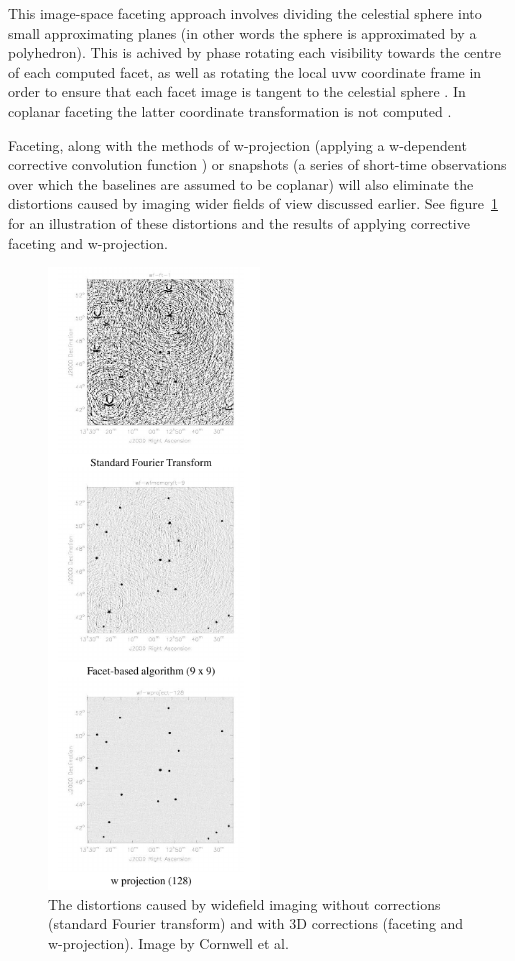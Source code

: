 \documentclass[a4paper, two column]{article}
\begin{document}
This image-space faceting approach involves dividing the celestial sphere into small approximating planes (in other words the sphere is approximated by a polyhedron). This is achived by phase rotating each visibility
towards the centre of each computed facet, as well as rotating the local uvw coordinate frame in order to ensure that each facet image is tangent to the celestial sphere \cite{cornwell1992radio}. In coplanar faceting
the latter coordinate transformation is not computed \cite{AIPS113}.

Faceting, along with the methods of w-projection (applying a w-dependent corrective convolution function \cite{cornwell2005w}) or snapshots (a series of short-time observations over which the baselines are assumed to be coplanar) will 
also eliminate the distortions caused by imaging wider fields of view discussed earlier. See figure~\ref{FIG_3D_DISTORTIONS} for an illustration of these distortions and the 
results of applying corrective faceting and w-projection.

\begin{figure}[h]
 \begin{mdframed}
 \centering
 \includegraphics[width=0.5\textwidth]{3d_correction.png}
 \caption{The distortions caused by widefield imaging without corrections (standard Fourier transform) and with 3D corrections (faceting and w-projection). Image by Cornwell et al. \cite{1416440}}
  \label{FIG_3D_DISTORTIONS}
 \end{mdframed}
\end{figure}
\end{document}
